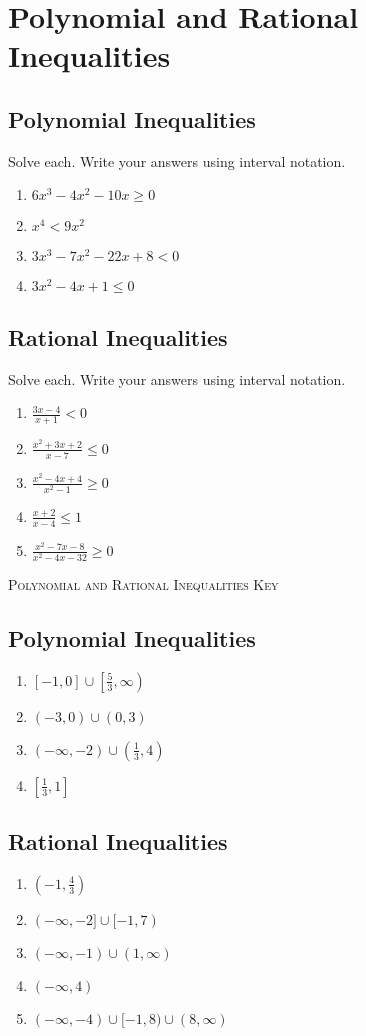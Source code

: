 \chapter{Polynomial and Rational Inequalities}

\section{Polynomial Inequalities}

Solve each. Write your answers using interval notation.
\begin{enumerate}
\item $6x^3-4x^2-10x \geq 0$
\item $x^4 < 9x^2$
\item $3x^3-7x^2-22x+8 < 0$
\item $3x^2 - 4x + 1 \leq 0$
\end{enumerate}

\section{Rational Inequalities}

Solve each. Write your answers using interval notation.
\begin{enumerate}
\setlength\itemsep{10pt}
\item $\frac{3x-4}{x+1}<0$
\item $\frac{x^2+3x+2}{x-7} \leq 0$
\item $\frac{x^2-4x+4}{x^2-1} \geq 0$
\item $\frac{x+2}{x-4} \leq 1$
\item $\frac{x^2-7x-8}{x^2-4x-32} \geq 0$
\end{enumerate}

\newpage

\textsc{Polynomial and Rational Inequalities Key}

\section*{Polynomial Inequalities}
\begin{enumerate}
    \item $[-1,0] \cup \left[\frac{5}{3}, \infty\right)$
    \item $(-3,0) \cup (0,3)$
    \item $(-\infty, -2) \cup \left(\frac{1}{3}, 4\right)$
    \item $\left[\frac{1}{3}, 1\right]$
\end{enumerate}
\section*{Rational Inequalities}
\begin{enumerate}
    \item $\left(-1, \frac{4}{3}\right)$
    \item $(-\infty,-2] \cup [-1, 7)$
    \item $(-\infty, -1) \cup (1, \infty)$
    \item $(-\infty, 4)$
    \item $(-\infty, -4) \cup [-1, 8) \cup (8, \infty)$
\end{enumerate}